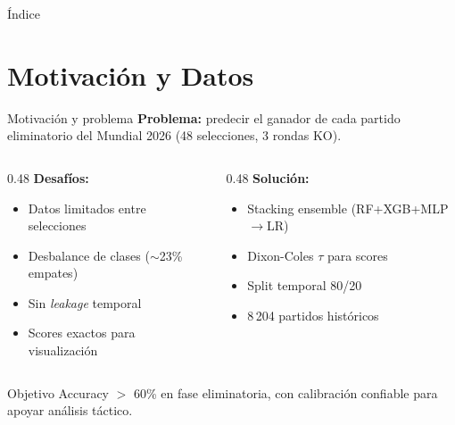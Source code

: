 \documentclass[aspectratio=169,10pt]{beamer}
\begin{document}
\begin{frame}{Índice}
  \tableofcontents
\end{frame}

\section{Motivación y Datos}

\begin{frame}{Motivación y problema}
  \textbf{Problema:} predecir el ganador de cada partido eliminatorio
  del Mundial 2026 (48 selecciones, 3 rondas KO).\\[0.3cm]

  \begin{columns}[T]
    \begin{column}{0.48\textwidth}
      \textbf{Desafíos:}
      \begin{itemize}\footnotesize
        \item Datos limitados entre selecciones
        \item Desbalance de clases ($\sim$23\% empates)
        \item Sin \emph{leakage} temporal
        \item Scores exactos para visualización
      \end{itemize}
    \end{column}
    \begin{column}{0.48\textwidth}
      \textbf{Solución:}
      \begin{itemize}\footnotesize
        \item Stacking ensemble (RF+XGB+MLP$\to$LR)
        \item Dixon-Coles $\tau$ para scores
        \item Split temporal 80/20
        \item 8\,204 partidos históricos
      \end{itemize}
    \end{column}
  \end{columns}

  \vspace{0.3cm}
  \begin{exampleblock}{Objetivo}
    Accuracy $>$ 60\% en fase eliminatoria, con calibración confiable
    para apoyar análisis táctico.
  \end{exampleblock}
\end{frame}
\end{document}

